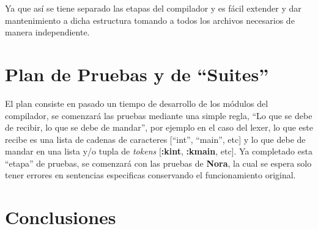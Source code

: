 \documentclass{article}
\begin{document}
Ya que así se tiene separado las etapas del compilador y es fácil extender y dar mantenimiento a dicha
estructura tomando a todos los archivos necesarios de manera independiente.

\section{Plan de Pruebas y de ``Suites''}

El plan consiste en pasado un tiempo de desarrollo de los módulos del
compilador, se comenzará las pruebas mediante una  simple regla, ``Lo
que se debe de recibir, lo que se debe de mandar'', por ejemplo en el
caso del lexer, lo que este recibe es una lista de cadenas de caracteres
[``int'', ``main'', etc] y lo que debe de mandar en una lista y/o tupla de
\textit{tokens} [\textbf{:kint}, \textbf{:kmain}, etc]. Ya completado esta ``etapa''
de pruebas, se comenzará con las pruebas de \textbf{Nora}, la cual se espera solo
tener errores en sentencias especificas conservando el funcionamiento original.

\section{Conclusiones}
\end{document}
